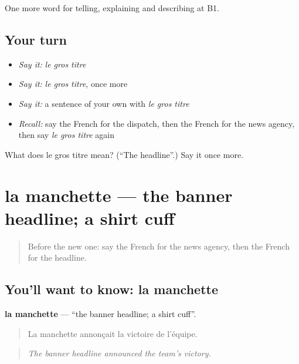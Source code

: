 \begin{grammarlens}[title={What you've built}]
One more word for telling, explaining and describing at B1.
\end{grammarlens}

\subsection*{Your turn}
\begin{itemize}
\raggedright
  \item \emph{Say it:} \emph{le gros titre}
  \item \emph{Say it:} \emph{le gros titre}, once more
  \item \emph{Say it:} a sentence of your own with \emph{le gros titre}
  \item \emph{Recall:} say the French for the dispatch, then the French for the news agency, then say \emph{le gros titre} again
\end{itemize}

\begin{tcolorbox}[breakable,colback=teal!4,colframe=teal!35!black,title={Before you move on}]
What does le gros titre mean? (\textquotedblleft{}The headline\textquotedblright{}.) Say it once more.
\end{tcolorbox}
\section[la manchette]{la manchette — the banner headline; a shirt cuff}

\label{lesson:FR-C282-manchette}



\begin{quote}
Before the new one: say the French for the news agency, then the French for the headline.
\end{quote}

\subsection*{You'll want to know: la manchette}
\textbf{la manchette} — \textquotedblleft{}the banner headline; a shirt cuff\textquotedblright{}.

\begin{quote}
La manchette annonçait la victoire de l'équipe.
\end{quote}

\begin{quote}
\emph{The banner headline announced the team's victory.}
\end{quote}

